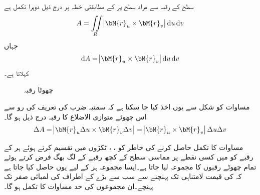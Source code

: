سطح  کے رقبہ  سے مراد  سطح پر  کے مطابقتی خطہ  پر درج ذیل دوہرا تکمل ہے
\begin{align}\label{مساوات_خطی_تکمل_رقبہ_الف}
A=\iint\limits_R \abs{\bM{r}_u\times \bM{r}_v}\dif u\dif v
\end{align}  
جہاں
\begin{align}\label{مساوات_خطی_تکمل_رقبہ_ب}
\dif A=\abs{\bM{r}_u\times \bM{r}_v}\dif u\dif v
\end{align}
 کہلاتا ہے۔
\begin{figure}
\centering
{}
\caption{چھوٹا رقبہ}
\label{شکل_خطی_تکمل_چھوٹا_رقبہ}
\end{figure}

مساوات   کو شکل  سے یوں اخذ کیا جا سکتا ہے کہ سمتیہ ضرب کی تعریف کی رو سے اس چھوٹے متوازی الاضلاع کا رقبہ درج ذیل ہو گا۔
\begin{align*}
\Delta A=\abs{\bM{r}_u\Delta u\times \bM{r}_v\Delta v}=\abs{\bM{r}_u\times \bM{r}_v}\Delta u\Delta v
\end{align*}

مساوات    کا تکمل حاصل کرنے کی خاطر  کو ، ، ٹکڑوں میں تقسیم کرتے ہوئے  ہر  کے رقبے کو  میں کسی نقطے پر  مماسی سطح کے کچھ رقبے کے لگ بھگ فرض کرتے ہوئے تمام چھوٹے رقبوں کا مجموعہ لیا جاتا ہے۔ایسا مجموعہ ہر  کے لیے  یوں حاصل کیا جاتا ہے کہ   کی قیمت لامتناہی تک پہنچنے سے  سب سے بڑے  کے اطراف کی لمبائی صفر تک پہنچے۔ان مجموعوں کی حد مساوات    کا تکمل ہو گا۔

